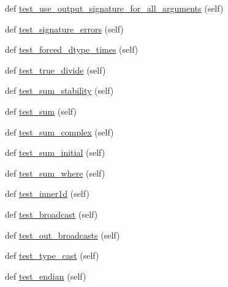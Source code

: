 \begin{DoxyCompactItemize}
\item 
def \hyperlink{classnumpy_1_1core_1_1tests_1_1test__ufunc_1_1TestUfunc_a120d1a0f231c03fe12ef401036e694fb}{test\+\_\+use\+\_\+output\+\_\+signature\+\_\+for\+\_\+all\+\_\+arguments} (self)
\item 
def \hyperlink{classnumpy_1_1core_1_1tests_1_1test__ufunc_1_1TestUfunc_a45498a427614f7b0375297461f153980}{test\+\_\+signature\+\_\+errors} (self)
\item 
def \hyperlink{classnumpy_1_1core_1_1tests_1_1test__ufunc_1_1TestUfunc_acac012cc2344a829d5367a4cd04b9b82}{test\+\_\+forced\+\_\+dtype\+\_\+times} (self)
\item 
def \hyperlink{classnumpy_1_1core_1_1tests_1_1test__ufunc_1_1TestUfunc_aff7d5ae7d7773603eac2f566e1053c81}{test\+\_\+true\+\_\+divide} (self)
\item 
def \hyperlink{classnumpy_1_1core_1_1tests_1_1test__ufunc_1_1TestUfunc_ab66086f5db10e31072af065129d2c67e}{test\+\_\+sum\+\_\+stability} (self)
\item 
def \hyperlink{classnumpy_1_1core_1_1tests_1_1test__ufunc_1_1TestUfunc_a3603b8c2b34d2718868458ca8540ac4d}{test\+\_\+sum} (self)
\item 
def \hyperlink{classnumpy_1_1core_1_1tests_1_1test__ufunc_1_1TestUfunc_a7f80f5fb23c591bbf0f1ae9a41a2cefa}{test\+\_\+sum\+\_\+complex} (self)
\item 
def \hyperlink{classnumpy_1_1core_1_1tests_1_1test__ufunc_1_1TestUfunc_a89d4439127f626ed61f65aeff3517e06}{test\+\_\+sum\+\_\+initial} (self)
\item 
def \hyperlink{classnumpy_1_1core_1_1tests_1_1test__ufunc_1_1TestUfunc_a0e7544e971b90fe8d3b4870840984fa3}{test\+\_\+sum\+\_\+where} (self)
\item 
def \hyperlink{classnumpy_1_1core_1_1tests_1_1test__ufunc_1_1TestUfunc_ae36b6cabdbc6d6a635c3c0805597b89f}{test\+\_\+inner1d} (self)
\item 
def \hyperlink{classnumpy_1_1core_1_1tests_1_1test__ufunc_1_1TestUfunc_a18b43622bc917405e77b321c7093c34b}{test\+\_\+broadcast} (self)
\item 
def \hyperlink{classnumpy_1_1core_1_1tests_1_1test__ufunc_1_1TestUfunc_a05335312cd0b6761886126b6f867e117}{test\+\_\+out\+\_\+broadcasts} (self)
\item 
def \hyperlink{classnumpy_1_1core_1_1tests_1_1test__ufunc_1_1TestUfunc_a50c6b03485fcd165aabf64089abd07f4}{test\+\_\+type\+\_\+cast} (self)
\item 
def \hyperlink{classnumpy_1_1core_1_1tests_1_1test__ufunc_1_1TestUfunc_ae3509954c27d1dfb97efd185ca85b96c}{test\+\_\+endian} (self)

\end{DoxyCompactItemize}
